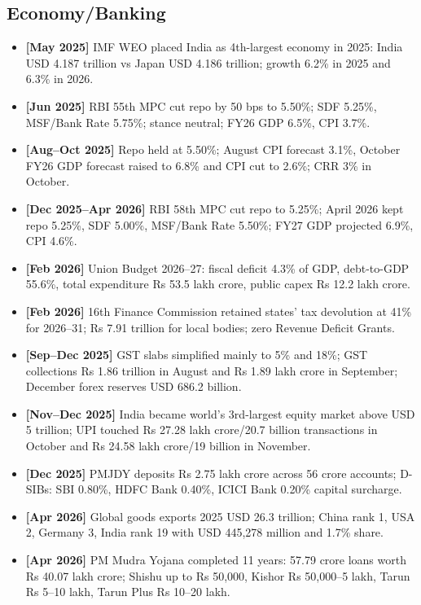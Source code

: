 \documentclass[10pt,a4paper]{article}
\newcommand{\monthtag}[1]{\textbf{[#1]}}
\newcommand{\fact}[2]{\item \monthtag{#1} #2}
\begin{document}
\subsection{Economy/Banking}
\begin{itemize}
    \fact{May 2025}{IMF WEO placed India as 4th-largest economy in 2025: India USD 4.187 trillion vs Japan USD 4.186 trillion; growth 6.2\% in 2025 and 6.3\% in 2026.}
    \fact{Jun 2025}{RBI 55th MPC cut repo by 50 bps to 5.50\%; SDF 5.25\%, MSF/Bank Rate 5.75\%; stance neutral; FY26 GDP 6.5\%, CPI 3.7\%.}
    \fact{Aug--Oct 2025}{Repo held at 5.50\%; August CPI forecast 3.1\%, October FY26 GDP forecast raised to 6.8\% and CPI cut to 2.6\%; CRR 3\% in October.}
    \fact{Dec 2025--Apr 2026}{RBI 58th MPC cut repo to 5.25\%; April 2026 kept repo 5.25\%, SDF 5.00\%, MSF/Bank Rate 5.50\%; FY27 GDP projected 6.9\%, CPI 4.6\%.}
    \fact{Feb 2026}{Union Budget 2026--27: fiscal deficit 4.3\% of GDP, debt-to-GDP 55.6\%, total expenditure Rs 53.5 lakh crore, public capex Rs 12.2 lakh crore.}
    \fact{Feb 2026}{16th Finance Commission retained states' tax devolution at 41\% for 2026--31; Rs 7.91 trillion for local bodies; zero Revenue Deficit Grants.}
    \fact{Sep--Dec 2025}{GST slabs simplified mainly to 5\% and 18\%; GST collections Rs 1.86 trillion in August and Rs 1.89 lakh crore in September; December forex reserves USD 686.2 billion.}
    \fact{Nov--Dec 2025}{India became world's 3rd-largest equity market above USD 5 trillion; UPI touched Rs 27.28 lakh crore/20.7 billion transactions in October and Rs 24.58 lakh crore/19 billion in November.}
    \fact{Dec 2025}{PMJDY deposits Rs 2.75 lakh crore across 56 crore accounts; D-SIBs: SBI 0.80\%, HDFC Bank 0.40\%, ICICI Bank 0.20\% capital surcharge.}
    \fact{Apr 2026}{Global goods exports 2025 USD 26.3 trillion; China rank 1, USA 2, Germany 3, India rank 19 with USD 445,278 million and 1.7\% share.}
    \fact{Apr 2026}{PM Mudra Yojana completed 11 years: 57.79 crore loans worth Rs 40.07 lakh crore; Shishu up to Rs 50,000, Kishor Rs 50,000--5 lakh, Tarun Rs 5--10 lakh, Tarun Plus Rs 10--20 lakh.}
\end{itemize}
\end{document}
